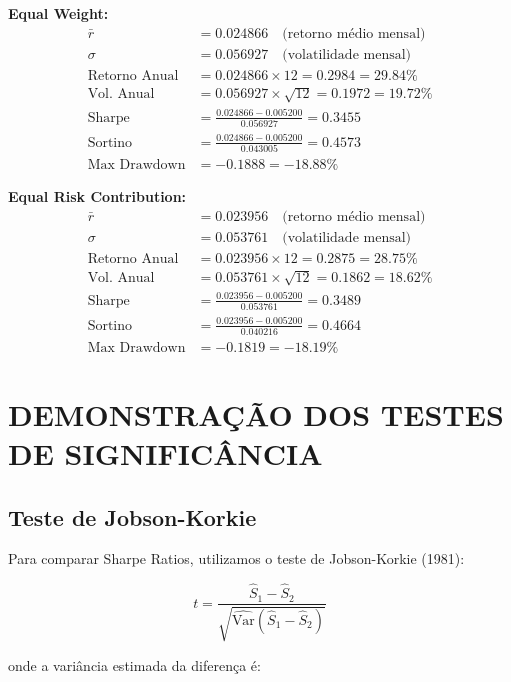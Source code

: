 \textbf{Equal Weight:}
\begin{align}
\bar{r} &= 0.024866 \quad \text{(retorno médio mensal)} \\
\sigma &= 0.056927 \quad \text{(volatilidade mensal)} \\
\text{Retorno Anual} &= 0.024866 \times 12 = 0.2984 = 29.84\% \\
\text{Vol. Anual} &= 0.056927 \times \sqrt{12} = 0.1972 = 19.72\% \\
\text{Sharpe} &= \frac{0.024866 - 0.005200}{0.056927} = 0.3455 \\
\text{Sortino} &= \frac{0.024866 - 0.005200}{0.043005} = 0.4573 \\
\text{Max Drawdown} &= -0.1888 = -18.88\%
\end{align}

\textbf{Equal Risk Contribution:}
\begin{align}
\bar{r} &= 0.023956 \quad \text{(retorno médio mensal)} \\
\sigma &= 0.053761 \quad \text{(volatilidade mensal)} \\
\text{Retorno Anual} &= 0.023956 \times 12 = 0.2875 = 28.75\% \\
\text{Vol. Anual} &= 0.053761 \times \sqrt{12} = 0.1862 = 18.62\% \\
\text{Sharpe} &= \frac{0.023956 - 0.005200}{0.053761} = 0.3489 \\
\text{Sortino} &= \frac{0.023956 - 0.005200}{0.040216} = 0.4664 \\
\text{Max Drawdown} &= -0.1819 = -18.19\%
\end{align}

\section{DEMONSTRAÇÃO DOS TESTES DE SIGNIFICÂNCIA}

\subsection{Teste de Jobson-Korkie}

Para comparar Sharpe Ratios, utilizamos o teste de Jobson-Korkie (1981):

\begin{equation}
t = \frac{\hat{S}_1 - \hat{S}_2}{\sqrt{\widehat{\text{Var}}(\hat{S}_1 - \hat{S}_2)}}
\end{equation}

onde a variância estimada da diferença é:


